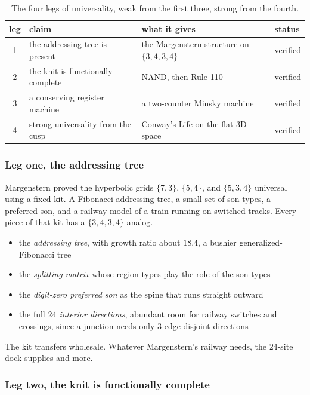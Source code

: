 \begin{table}[ht]
\centering
\begin{tabular}{@{}clll@{}}
\toprule
leg & claim & what it gives & status \\
\midrule
1 & the addressing tree is present & the Margenstern structure on $\{3,4,3,4\}$ & verified \\
2 & the knit is functionally complete & NAND, then Rule 110 & verified \\
3 & a conserving register machine & a two-counter Minsky machine & verified \\
4 & strong universality from the cusp & Conway's Life on the flat 3D space & verified \\
\bottomrule
\end{tabular}
\caption{The four legs of universality, weak from the first three, strong from the fourth.}
\label{tab:universality-legs}
\end{table}

\subsubsection{Leg one, the addressing tree}

Margenstern proved the hyperbolic grids $\{7,3\}$, $\{5,4\}$, and $\{5,3,4\}$ universal using a fixed kit. A Fibonacci addressing tree, a small set of son types, a preferred son, and a railway model of a train running on switched tracks. Every piece of that kit has a $\{3,4,3,4\}$ analog.

\begin{itemize}
\item the \emph{addressing tree}, with growth ratio about $18.4$, a bushier generalized-Fibonacci tree
\item the \emph{splitting matrix} whose region-types play the role of the son-types
\item the \emph{digit-zero preferred son} as the spine that runs straight outward
\item the full \emph{$24$ interior directions}, abundant room for railway switches and crossings, since a junction needs only $3$ edge-disjoint directions
\end{itemize}

The kit transfers wholesale. Whatever Margenstern's railway needs, the $24$-site dock supplies and more.

\subsubsection{Leg two, the knit is functionally complete}

